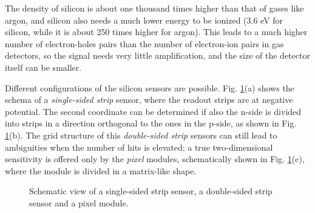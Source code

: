 The density of silicon is about one thousand times higher than that of gases like argon, and silicon also needs a much lower energy to be ionized (3.6 eV for silicon, while it is about 250 times higher for argon). This leads to a much higher number of electron-holes pairs than the number of electron-ion pairs in gas detectors, so the signal needs very little amplification, and the size of the detector itself can be smaller. 

Different configurations of the silicon sensors are possible. Fig. \ref{fig:det:silicon_schema}(a) shows the schema of a \textit{single-sided strip} sensor, where the readout strips are at negative potential. The second coordinate can be determined if also the n-side is divided into strips in a direction orthogonal to the ones in the p-side, as shown in Fig. \ref{fig:det:silicon_schema}(b). The grid structure of this \textit{double-sided strip} sensors can still lead to ambiguities when the number of hits is elevated; a true two-dimensional sensitivity is offered only by the \textit{pixel} modules, schematically shown in Fig. \ref{fig:det:silicon_schema}(c), where the module is divided in a matrix-like shape.

\begin{figure}[ht]
\centering
{}
\caption{Schematic view of  a single-sided strip sensor,
 a double-sided strip sensor and  a pixel module. }
\label{fig:det:silicon_schema}
\end{figure}



